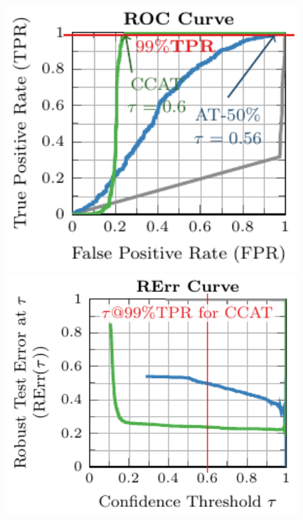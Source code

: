 \begin{figure}[t]
    \vspace*{0px}
    \centering
    
    \hspace*{-0.3cm}
    \begin{minipage}[t]{0.23\textwidth}
        \vspace*{0px}
        
        \centering
        \includegraphics[width=1.05\textwidth]{fig_msvhn_roc}
    \end{minipage}
    \begin{minipage}[t]{0.25\textwidth}
        \vspace*{0px}
        
        \centering			
        \includegraphics[width=1.05\textwidth]{fig_msvhn_rte}
    \end{minipage}\\
    

\end{figure}
